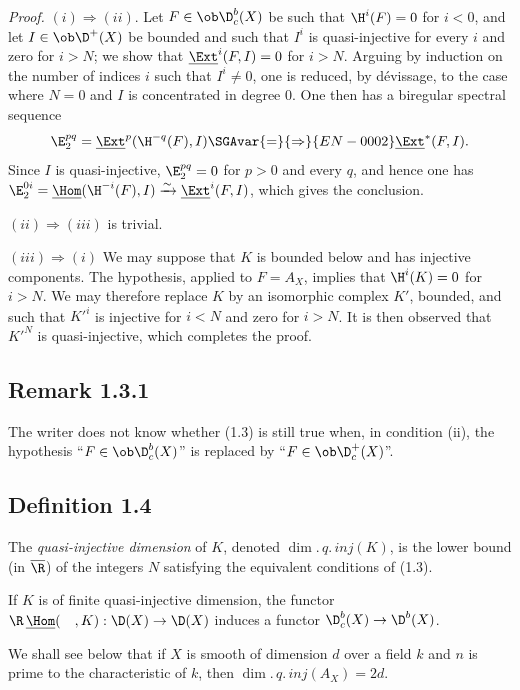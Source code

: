 \emph{Proof.} $(i) \Rightarrow (ii)$. Let $F \in \ob \D_c^{b}(X)$ be such that $\H^i(F) = 0$ for $i < 0$, and let $I \in \ob \D^{+}(X)$ be bounded and such that $I^i$ is quasi-injective for every $i$ and zero for $i > N$; we show that $\underline{\Ext}^i(F,I) = 0$ for $i > N$. Arguing by induction on the number of indices $i$ such that $I^i \neq 0$, one is reduced, by dévissage, to the case where $N = 0$ and $I$ is concentrated in degree $0$. One then has a biregular spectral sequence
\[
\E_2^{pq} = \underline{\Ext}^p(\H^{-q}(F),I) \SGAvar{=}{\Rightarrow}{EN-0002} \underline{\Ext}^{*}(F,I).
\]
Since $I$ is quasi-injective, $\E_2^{pq} = 0$ for $p > 0$ and every $q$, and hence one has $\E_2^{0i} = \underline{\Hom}(\H^{-i}(F),I) \xrightarrow{\sim} \underline{\Ext}^i(F,I)$, which gives the conclusion.

$(ii) \Rightarrow (iii)$ is trivial.

$(iii) \Rightarrow (i)$ We may suppose that $K$ is bounded below and has injective components. The hypothesis, applied to $F = A_X$, implies that $\H^i(K) = 0$ for $i > N$. We may therefore replace $K$ by an isomorphic complex $K'$, bounded, and such that $K'^i$ is injective for $i < N$ and zero for $i > N$. It is then observed that $K'^N$ is quasi-injective, which completes the proof.

\subsection*{Remark 1.3.1}
The writer does not know whether (1.3) is still true when, in condition (ii), the hypothesis ``$F \in \ob \D_c^{b}(X)$'' is replaced by ``$F \in \ob \D_c^{+}(X)$''.

\subsection*{Definition 1.4}
The \emph{quasi-injective dimension} of $K$, denoted $\dim.\,q.\,inj(K)$, is the lower bound (in $\overline{\R}$) of the integers $N$ satisfying the equivalent conditions of (1.3).

If $K$ is of finite quasi-injective dimension, the functor $\R\,\underline{\Hom}(\quad,K) : \D(X) \to \D(X)$ induces a functor $\D_c^{b}(X) \to \D^{b}(X)$.

We shall see below that if $X$ is smooth of dimension $d$ over a field $k$ and $n$ is prime to the characteristic of $k$, then $\dim.\,q.\,inj(A_X) = 2d$.


